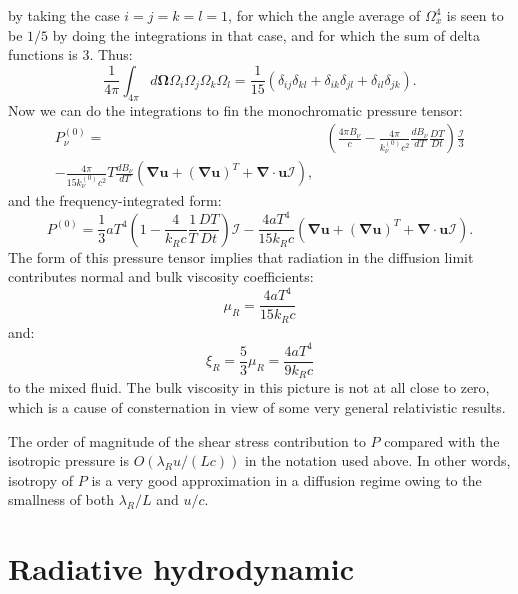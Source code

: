 \documentclass[letterpaper]{report}
\newcommand\bn{\boldsymbol{\nabla}}
\newcommand\bo{\boldsymbol{\Omega}}
\newcommand\bu{\mathbf{u}}
\newcommand\mc{\mathcal}
\renewcommand{\(}{\left(}
\renewcommand{\)}{\right)}
\renewcommand{\[}{\left[}
\renewcommand{\]}{\right]}
\begin{document}
by taking the case $i=j=k=l=1$, for which the angle average of $\Omega_x^4$ is
seen to be $1/5$ by doing the integrations in that case, and for which the sum
of delta functions is 3. Thus:
\begin{equation}
  \frac{1}{4\pi}\int_{4\pi}d\bo\Omega_i\Omega_j\Omega_k\Omega_l =
  \frac{1}{15}\(\delta_{ij}\delta_{kl}+\delta_{ik}\delta_{jl}+
  \delta_{il}\delta_{jk}\).
  \label{6.76}
\end{equation}
Now we can do the integrations to fin the monochromatic pressure tensor:
\begin{equation}
  \begin{split}
    P_{\nu}^{(0)} =&\(\frac{4\pi B_{\nu}}{c}-\frac{4\pi}{k_{\nu}^{(0)}c^2}
    \frac{dB_{\nu}}{dT}\frac{DT}{Dt}\)\frac{\mc{I}}{3}\\
    -\frac{4\pi}{15k_{\nu}^{(0)}c^2}T\frac{dB_{\nu}}{dT}\(\bn\bu+\(\bn\bu\)^T+
    \bn\cdot\bu\mc{I}\),
  \end{split}
  \label{6.77}
\end{equation}
and the frequency-integrated form:
\begin{equation}
  P^{(0)} = \frac{1}{3}aT^4\(1-\frac{4}{k_Rc}\frac{1}{T}\frac{DT}{Dt}\)\mc{I}
  -\frac{4aT^4}{15k_Rc}\(\bn\bu+\(\bn\bu\)^T+\bn\cdot\bu\mc{I}\).
  \label{6.78}
\end{equation}
The form of this pressure tensor implies that radiation in the diffusion limit
contributes normal and bulk viscosity coefficients:
\begin{equation}
  \mu_R = \frac{4aT^4}{15k_R c}
  \label{6.79}
\end{equation}
and:
\begin{equation}
  \xi_R =\frac{5}{3}\mu_R =\frac{4aT^4}{9k_Rc}
  \label{6.80}
\end{equation}
to the mixed fluid. The bulk viscosity in this picture is not at all close to
zero, which is a cause of consternation in view of some very general
relativistic results.

The order of magnitude of the shear stress contribution to $P$ compared with
the isotropic pressure is $O(\lambda_R u/(Lc))$ in the notation used above. In
other words, isotropy of $P$ is a very good approximation in a diffusion
regime owing to the smallness of both $\lambda_R/L$ and $u/c$.

\section{Radiative hydrodynamic}
\end{document}
